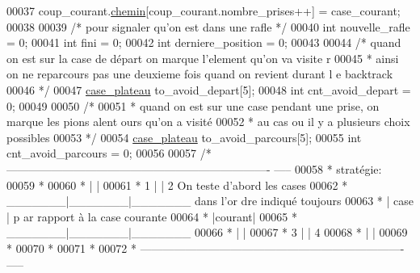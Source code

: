 \begin{DoxyCode}
00037         coup\_courant.\hyperlink{structcoup_aa66b88eb8140c2f459ac92fad0796510}{chemin}[coup\_courant.nombre\_prises++] = case\_courant;
00038 
00039         \textcolor{comment}{/* pour signaler qu'on est dans une rafle */}
00040         \textcolor{keywordtype}{int} nouvelle\_rafle = 0;
00041         \textcolor{keywordtype}{int} fini = 0;
00042         \textcolor{keywordtype}{int} derniere\_position = 0;
00043 
00044         \textcolor{comment}{/* quand on est sur la case de départ on marque l'element qu'on va visite
      r}
00045 \textcolor{comment}{         * ainsi on ne reparcours pas une deuxieme fois quand on revient durant l
      e backtrack}
00046 \textcolor{comment}{         */}
00047         \hyperlink{structcase__plateau}{case_plateau} to\_avoid\_depart[5];
00048         \textcolor{keywordtype}{int} cnt\_avoid\_depart = 0;
00049 
00050         \textcolor{comment}{/*}
00051 \textcolor{comment}{         * quand on est sur une case pendant une prise, on marque les pions alent
      ours qu'on a visité}
00052 \textcolor{comment}{         * au cas ou il y a plusieurs choix possibles}
00053 \textcolor{comment}{         */}
00054         \hyperlink{structcase__plateau}{case_plateau} to\_avoid\_parcours[5];
00055         \textcolor{keywordtype}{int} cnt\_avoid\_parcours = 0;
00056 
00057         \textcolor{comment}{/* ----------------------------------------------------------------------
      -----}
00058 \textcolor{comment}{         * stratégie:}
00059 \textcolor{comment}{         *}
00060 \textcolor{comment}{         *                     |       |}
00061 \textcolor{comment}{         *         1   |       |   2                            On teste d'abord 
      les cases}
00062 \textcolor{comment}{         *              \_\_\_\_\_\_\_|\_\_\_\_\_\_\_|\_\_\_\_\_\_\_                         dans l'or
      dre indiqué toujours}
00063 \textcolor{comment}{         *                     | case  |                                        p
      ar rapport à la case courante}
00064 \textcolor{comment}{         *             |courant|}
00065 \textcolor{comment}{         *              \_\_\_\_\_\_\_|\_\_\_\_\_\_\_|\_\_\_\_\_\_\_}
00066 \textcolor{comment}{         *                     |       |}
00067 \textcolor{comment}{         *                 3   |       |   4}
00068 \textcolor{comment}{         *             |       |}
00069 \textcolor{comment}{         *}
00070 \textcolor{comment}{         *}
00071 \textcolor{comment}{         *}
00072 \textcolor{comment}{         * ----------------------------------------------------------------------
      -----}

\end{DoxyCode}
